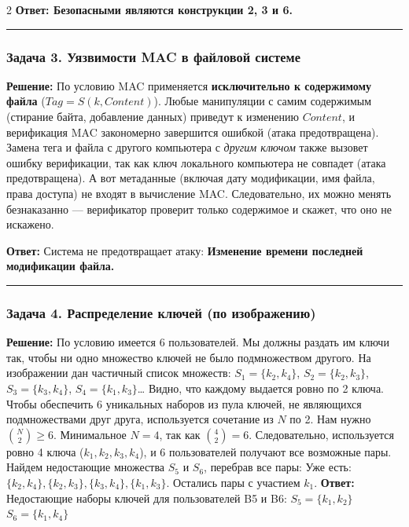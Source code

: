 ﻿\documentclass[10pt,a4paper,landscape]{extarticle}
\begin{document}
\begin{multicols*}{2}
\textbf{Ответ: Безопасными являются конструкции 2, 3 и 6.}

\begin{center}\rule{0.5\linewidth}{0.5pt}\end{center}

\subsubsection{Задача 3. Уязвимости MAC в файловой системе}\label{ux437ux430ux434ux430ux447ux430-3.-ux443ux44fux437ux432ux438ux43cux43eux441ux442ux438-mac-ux432-ux444ux430ux439ux43bux43eux432ux43eux439-ux441ux438ux441ux442ux435ux43cux435}

\textbf{Решение:} По условию MAC применяется \textbf{исключительно к содержимому файла} (\(Tag = S(k, Content)\)). Любые манипуляции с самим содержимым (стирание байта, добавление данных) приведут к изменению \(Content\), и верификация MAC закономерно завершится ошибкой (атака предотвращена). Замена тега и файла с другого компьютера с \emph{другим ключом} также вызовет ошибку верификации, так как ключ локального компьютера не совпадет (атака предотвращена). А вот метаданные (включая дату модификации, имя файла, права доступа) не входят в вычисление MAC. Следовательно, их можно менять безнаказанно --- верификатор проверит только содержимое и скажет, что оно не искажено.

\textbf{Ответ:} Система не предотвращает атаку: \textbf{Изменение времени последней модификации файла.}

\begin{center}\rule{0.5\linewidth}{0.5pt}\end{center}

\subsubsection{Задача 4. Распределение ключей (по изображению)}\label{ux437ux430ux434ux430ux447ux430-4.-ux440ux430ux441ux43fux440ux435ux434ux435ux43bux435ux43dux438ux435-ux43aux43bux44eux447ux435ux439-ux43fux43e-ux438ux437ux43eux431ux440ux430ux436ux435ux43dux438ux44e}

\textbf{Решение:} По условию имеется 6 пользователей. Мы должны раздать им ключи так, чтобы ни одно множество ключей не было подмножеством другого. На изображении дан частичный список множеств: \(S_1 = \{k_2, k_4\}\), \(S_2 = \{k_2, k_3\}\), \(S_3 = \{k_3, k_4\}\), \(S_4 = \{k_1, k_3\}\)\ldots{} Видно, что каждому выдается ровно по 2 ключа. Чтобы обеспечить 6 уникальных наборов из пула ключей, не являющихся подмножествами друг друга, используется сочетание из \(N\) по 2. Нам нужно \(\binom{N}{2} \ge 6\). Минимальное \(N=4\), так как \(\binom{4}{2} = 6\). Следовательно, используется ровно 4 ключа (\(k_1, k_2, k_3, k_4\)), и 6 пользователей получают все возможные пары. Найдем недостающие множества \(S_5\) и \(S_6\), перебрав все пары: Уже есть: \(\{k_2, k_4\}, \{k_2, k_3\}, \{k_3, k_4\}, \{k_1, k_3\}\). Остались пары с участием \(k_1\). \textbf{Ответ:} Недостающие наборы ключей для пользователей B5 и B6: \textbf{\(S_5 = \{k_1, k_2\}\)} \textbf{\(S_6 = \{k_1, k_4\}\)}


\end{multicols*}
\end{document}
